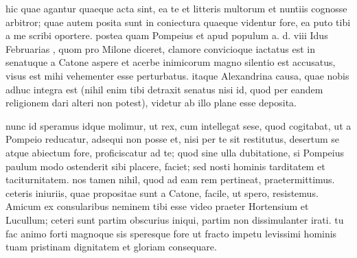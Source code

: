 


 hic quae agantur quaeque acta sint, ea te et litteris multorum et nuntiis cognosse arbitror; quae autem posita sunt in coniectura quaeque videntur fore, ea puto tibi a me scribi oportere. postea quam Pompeius et apud populum a. d. viii Idus Februarias , quom pro Milone diceret, clamore convicioque iactatus est in senatuque a Catone aspere et acerbe inimicorum magno silentio est accusatus, visus est mihi vehementer esse perturbatus. itaque Alexandrina causa, quae nobis adhuc integra est (nihil enim tibi detraxit senatus nisi id, quod per eandem religionem dari alteri non potest), videtur ab illo plane esse deposita.

 nunc id speramus idque molimur, ut rex, cum intellegat sese, quod cogitabat, ut a Pompeio reducatur, adsequi non posse et, nisi per te sit restitutus, desertum se atque abiectum fore, proficiscatur ad te; quod sine ulla dubitatione, si Pompeius paulum modo ostenderit sibi placere, faciet; sed nosti hominis tarditatem et taciturnitatem. nos tamen nihil, quod ad eam rem pertineat, praetermittimus. ceteris iniuriis, quae propositae sunt a Catone, facile, ut spero, resistemus. Amicum ex consularibus neminem tibi esse video praeter Hortensium et Lucullum; ceteri sunt partim obscurius iniqui, partim non dissimulanter irati. tu fac animo forti magnoque sis speresque fore ut fracto impetu levissimi hominis tuam pristinam dignitatem et gloriam consequare.
